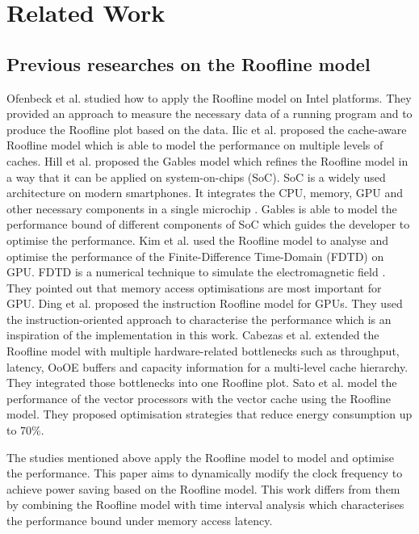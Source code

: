 \chapter{Related Work}

\section{Previous researches on the Roofline model}
Ofenbeck et al.  \cite{28} studied how to apply the Roofline model on Intel platforms. They provided an approach to measure the necessary data of a running program and to produce the Roofline plot based on the data. Ilic et al. \cite{27} proposed the cache-aware Roofline model which is able to model the performance on multiple levels of caches. Hill et al. \cite{29} proposed the Gables model which refines the Roofline model in a way that it can be applied on system-on-chips (SoC). SoC is a widely used architecture on modern smartphones. It integrates the CPU, memory, GPU and other necessary components in a single microchip \cite{30}. Gables is able to model the performance bound of different components of SoC which guides the developer to optimise the performance. Kim et al. \cite{31} used the Roofline model to analyse and optimise the performance of the Finite-Difference Time-Domain (FDTD) on GPU. FDTD is a numerical technique to simulate the electromagnetic field \cite{32}. They pointed out that memory access optimisations are most important for GPU.  Ding et al. \cite{33} proposed the instruction Roofline model for GPUs. They used the instruction-oriented approach to characterise the performance which is an inspiration of the implementation in this work. Cabezas et al. \cite{35} extended the Roofline model with multiple hardware-related bottlenecks such as throughput, latency, OoOE buffers and capacity information for a multi-level cache hierarchy. They integrated those bottlenecks into one Roofline plot. Sato et al. \cite{36} model the performance of the vector processors with the vector cache using the Roofline model. They proposed optimisation strategies that reduce energy consumption up to 70\%.


The studies mentioned above apply the Roofline model to model and optimise the performance. This paper aims to dynamically modify the clock frequency to achieve power saving based on the Roofline model. This work differs from them by combining the Roofline model with time interval analysis which characterises the performance bound under memory access latency. 

